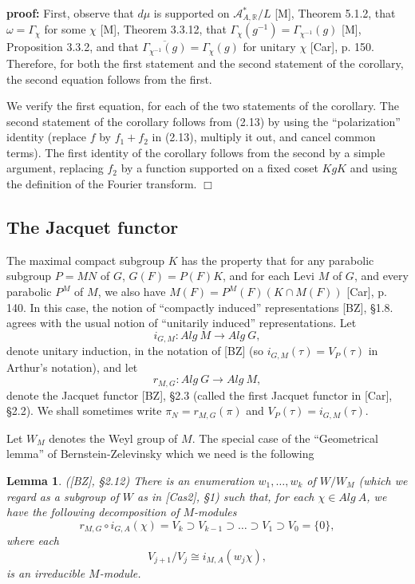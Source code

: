 \documentclass[12pt]{article}
\newtheorem{lemma}{Lemma}[section]
\newenvironment{pf}[1][proof:]{\par\medskip\noindent\textbf{#1} }{\par\medskip}
\begin{document}
\begin{pf}
First, observe that $d\mu$ is supported on $\mathcal{A}^*_{A,\mathbb{R}}/L$ [M], Theorem 5.1.2, that $\omega=\Gamma_\chi$ for some $\chi$ [M], Theorem 3.3.12, that $\Gamma_\chi(g^{-1})=\Gamma_{\chi^{-1}}(g)$ [M], Proposition 3.3.2, and that $\overline{\Gamma_{\chi^{-1}}(g)}=\Gamma_\chi(g)$ for unitary $\chi$ [Car], p. 150. Therefore, for both the first statement and the second statement of the corollary, the second equation follows from the first.

We verify the first equation, for each of the two statements of the corollary. The second statement of the corollary follows from (2.13) by using the ``polarization'' identity (replace $f$ by $f_1+f_2$ in (2.13), multiply it out, and cancel common terms). The first identity of the corollary follows from the second by a simple argument, replacing $f_2$ by a function supported on a fixed coset $KgK$ and using the definition of the Fourier transform. $\Box$
\end{pf}

\subsection{The Jacquet functor}

The maximal compact subgroup $K$ has the property that for any parabolic subgroup $P=MN$ of $G$, $G(F)=P(F)K$, and for each Levi $M$ of $G$, and every parabolic $P^M$ of $M$, we also have $M(F)=P^M(F)(K\cap M(F))$ [Car], p. 140. In this case, the notion of ``compactly induced'' representations [BZ], \S1.8. agrees with the usual notion of ``unitarily induced'' representations. Let
\begin{equation}\tag{2.14}
i_{G,M}:Alg\ M\rightarrow Alg\ G,
\end{equation}
denote unitary induction, in the notation of [BZ] (so $i_{G,M}(\tau)=V_P(\tau)$ in Arthur's notation), and let
\begin{equation}\tag{2.15}
r_{M,G}:Alg\ G\rightarrow Alg\ M,
\end{equation}
denote the Jacquet functor [BZ], \S2.3 (called the first Jacquet functor in [Car], \S2.2). We shall sometimes write $\pi_N=r_{M,G}(\pi)$ and $V_P(\tau)=i_{G,M}(\tau)$.

Let $W_M$ denotes the Weyl group of $M$. The special case of the ``Geometrical lemma'' of Bernstein-Zelevinsky which we need is the following

\begin{lemma}
([BZ], \S2.12) There is an enumeration $w_1,\dots,w_k$ of $W/W_M$ (which we regard as a subgroup of $W$ as in [Cas2], \S1) such that, for each $\chi\in Alg\ A$, we have the following decomposition of $M$-modules
\[
r_{M,G}\circ i_{G,A}(\chi)=V_k\supset V_{k-1}\supset\dots\supset V_1\supset V_0=\{0\},
\]
where each
\[
V_{j+1}/V_j\cong i_{M,A}(w_j\chi),
\]
is an irreducible $M$-module.
\end{lemma}
\end{document}
